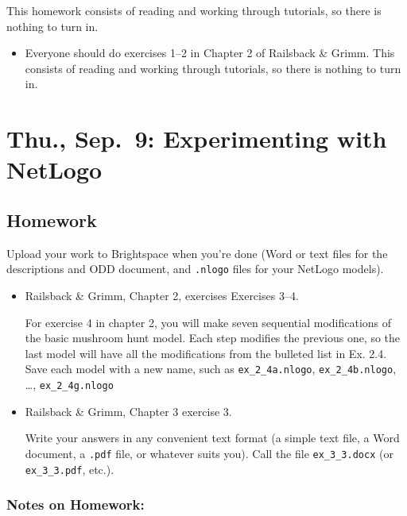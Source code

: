 \documentclass[
]{article}
\providecommand{\tightlist}{%
  \setlength{\itemsep}{0pt}\setlength{\parskip}{0pt}}
\begin{document}
This homework consists of reading and working through tutorials, so
there is nothing to turn in.

\begin{itemize}
\tightlist
\item
  Everyone should do exercises 1--2 in Chapter 2 of Railsback \& Grimm.
  This consists of reading and working through tutorials, so there is
  nothing to turn in.
\end{itemize}

\hypertarget{thu.-sep.-9-experimenting-with-netlogo}{%
\section{Thu., Sep.~9: Experimenting with
NetLogo}\label{thu.-sep.-9-experimenting-with-netlogo}}

\hypertarget{homework-3}{%
\subsection{Homework}\label{homework-3}}

Upload your work to Brightspace when you're done (Word or text files for
the descriptions and ODD document, and \texttt{.nlogo} files for your
NetLogo models).

\begin{itemize}
\item
  Railsback \& Grimm, Chapter 2, exercises Exercises 3--4.

  For exercise 4 in chapter 2, you will make seven sequential
  modifications of the basic mushroom hunt model. Each step modifies the
  previous one, so the last model will have all the modifications from
  the bulleted list in Ex. 2.4. Save each model with a new name, such as
  \texttt{ex\_2\_4a.nlogo}, \texttt{ex\_2\_4b.nlogo}, \dots,
  \texttt{ex\_2\_4g.nlogo}
\item
  Railsback \& Grimm, Chapter 3 exercise 3.

  Write your answers in any convenient text format (a simple text file,
  a Word document, a \texttt{.pdf} file, or whatever suits you). Call
  the file \texttt{ex\_3\_3.docx} (or \texttt{ex\_3\_3.pdf}, etc.).
\end{itemize}

\hypertarget{notes-on-homework-1}{%
\subsubsection{Notes on Homework:}\label{notes-on-homework-1}}
\end{document}
